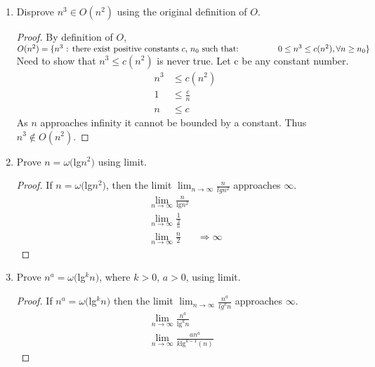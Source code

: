 \documentclass{article}
\begin{document}
\begin{enumerate}
\begin{proof}
\begin{align*}
                        -2 &\leq 1
                    \end{align*}
                    This shows that $n^2-3n-20\in\Theta(n^2)$ is true with $c_1 = \frac{1}{2}$, $c_2 = 1$ for all $n \geq 10$
                \end{proof}
            \item Disprove $n^3\in O(n^2)$ using the original definition of $O$.
                \begin{proof}
                    By definition of $O$,\\$O(n^2) = \{n^3 \text{ : there exist positive constants } c \text{, } n_0 \text{ such that: }\\ 
                    \text{\hspace{1.5cm}}0\leq n^3\leq c(n^2), \forall n\geq n_0\}$\\
                    Need to show that $n^3\leq c(n^2)$ is never true. Let c be any constant number.
                    \begin{align*}
                        n^3 &\leq c(n^2)\\
                        1 &\leq \frac{c}{n} \\
                        n &\leq c
                    \end{align*}
                    As $n$ approaches infinity it cannot be bounded by a constant. Thus $n^3\not\in O(n^2)$.
                \end{proof}
            \item Prove $n=\omega($lg$n^2)$ using limit.
                \begin{proof}
                    If $n=\omega($lg$n^2)$, then the limit $\lim_{n\to\infty}\frac{n}{lgn^2}$ approaches $\infty$.
                    \begin{align*}
                        \lim_{n\to\infty}\frac{n}{\text{lg}n^2}&\\
                        \lim_{n\to\infty}\frac{1}{\frac{2}{n}}&\\
                        \lim_{n\to\infty}\frac{n}{2}& \Rightarrow \infty
                    \end{align*}
                \end{proof}
            \item Prove $n^a=\omega($lg$^kn)$, where $k>0$, $a>0$, using limit.
                \begin{proof}
                    If $n^a=\omega($lg$^kn)$ then the limit $\lim_{n\to\infty}\frac{n^a}{lg^kn}$ approaches $\infty$.
                    \begin{align*}
                        \lim_{n\to\infty}\frac{n^a}{\text{lg}^kn}&\\
                        \lim_{n\to\infty}\frac{an^{a}}{k\text{lg}^{k-1}(n)}&
                    \end{align*}
                \end{proof}
        \end{enumerate}
    
\end{document}
